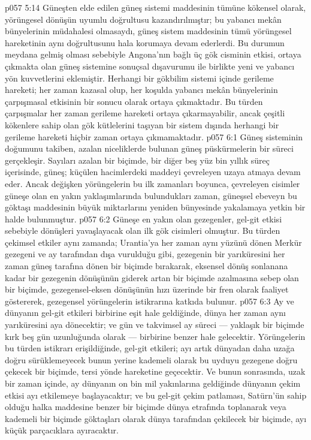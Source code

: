 \vs p057 5:14 Güneşten elde edilen güneş sistemi maddesinin tümüne kökensel olarak, yörüngesel dönüşün uyumlu doğrultusu kazandırılmıştır; bu yabancı mekân bünyelerinin müdahalesi olmasaydı, güneş sistem maddesinin tümü yörüngesel hareketinin aynı doğrultusunu hala korumaya devam ederlerdi. Bu durumun meydana gelmiş olması sebebiyle Angona’nın bağlı üç gök cisminin etkisi, ortaya çıkmakta olan güneş sistemine  sonuçsal dışavurumu ile birlikte yeni ve yabancı yön kuvvetlerini eklemiştir. Herhangi bir gökbilim sistemi içinde gerileme hareketi; her zaman kazasal olup, her koşulda yabancı mekân bünyelerinin çarpışmasal etkisinin bir sonucu olarak ortaya çıkmaktadır. Bu türden çarpışmalar her zaman gerileme hareketi ortaya çıkarmayabilir, ancak çeşitli kökenlere sahip olan gök kütlelerini taşıyan bir sistem dışında herhangi bir gerileme hareketi hiçbir zaman ortaya çıkmamaktadır.
\vs p057 6:1 Güneş sisteminin doğumunu takiben, azalan niceliklerde bulunan güneş püskürmelerin bir süreci gerçekleşir. Sayıları azalan bir biçimde, bir diğer beş yüz bin yıllık süreç içerisinde, güneş; küçülen hacimlerdeki maddeyi çevreleyen uzaya atmaya devam eder. Ancak değişken yörüngelerin bu ilk zamanları boyunca, çevreleyen cisimler güneşe olan en yakın yaklaşımlarında bulundukları zaman, güneşsel ebeveyn bu göktaşı maddesinin büyük miktarlarını yeniden bünyesinde yakalamaya yetkin bir halde bulunmuştur.
\vs p057 6:2 Güneşe en yakın olan gezegenler, gel\hyp{}git etkisi sebebiyle dönüşleri yavaşlayacak olan ilk gök cisimleri olmuştur. Bu türden çekimsel etkiler aynı zamanda; Urantia’ya her zaman aynı yüzünü dönen Merkür gezegeni ve ay tarafından dışa vurulduğu gibi, gezegenin bir yarıküresini her zaman güneş tarafına dönen bir biçimde bırakarak, eksensel dönüş sonlanana kadar bir gezegenin dönüşünün giderek artan bir biçimde azalmasına sebep olan bir biçimde, gezegensel\hyp{}eksen dönüşünün hızı üzerinde bir fren olarak faaliyet göstererek, gezegensel yörüngelerin istikrarına katkıda bulunur.
\vs p057 6:3 Ay ve dünyanın gel\hyp{}git etkileri birbirine eşit hale geldiğinde, dünya her zaman aynı yarıküresini aya dönecektir; ve gün ve takvimsel ay süreci --- yaklaşık bir biçimde kırk beş gün uzunluğunda olarak --- birbirine benzer hale gelecektir. Yörüngelerin bu türden istikrarı erişildiğinde, gel\hyp{}git etkileri; ayı artık dünyadan daha uzağa doğru sürüklemeyecek bunun yerine kademeli olarak bu uyduyu gezegene doğru çekecek bir biçimde, tersi yönde hareketine geçecektir. Ve bunun sonrasında, uzak bir zaman içinde, ay dünyanın on bin mil yakınlarına geldiğinde dünyanın çekim etkisi ayı etkilemeye başlayacaktır; ve bu gel\hyp{}git çekim patlaması, Satürn’ün sahip olduğu halka maddesine benzer bir biçimde dünya etrafında toplanarak veya kademeli bir biçimde göktaşları olarak dünya tarafından çekilecek bir biçimde, ayı küçük parçacıklara ayıracaktır.
